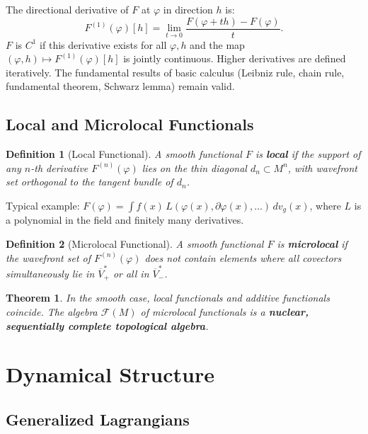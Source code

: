 \documentclass[11pt,a4paper]{article}
\newtheorem{definition}{Definition}[section]
\newtheorem{theorem}{Theorem}[section]
\begin{document}
The directional derivative of $F$ at $\varphi$ in direction $h$ is:
\begin{equation}
  F^{(1)}(\varphi)[h] = \lim_{t \to 0} \frac{F(\varphi + th) - F(\varphi)}{t}.
\end{equation}
$F$ is $C^1$ if this derivative exists for all $\varphi, h$ and the map
$(\varphi, h) \mapsto F^{(1)}(\varphi)[h]$ is jointly continuous. Higher
derivatives are defined iteratively. The fundamental results of basic
calculus (Leibniz rule, chain rule, fundamental theorem, Schwarz lemma)
remain valid.

\subsection{Local and Microlocal Functionals}

\begin{definition}[Local Functional]
A smooth functional $F$ is \textbf{local} if the support of any
$n$-th derivative $F^{(n)}(\varphi)$ lies on the thin diagonal
$d_n \subset M^n$, with wavefront set orthogonal to the tangent
bundle of $d_n$.
\end{definition}

Typical example: $F(\varphi) = \int f(x)\, L(\varphi(x), \partial\varphi(x),\ldots)\, dv_g(x)$,
where $L$ is a polynomial in the field and finitely many derivatives.

\begin{definition}[Microlocal Functional]
A smooth functional $F$ is \textbf{microlocal} if the wavefront set
of $F^{(n)}(\varphi)$ does not contain elements where all covectors
simultaneously lie in $\overline{V}_+^*$ or all in $\overline{V}_-^*$.
\end{definition}

\begin{theorem}
In the smooth case, local functionals and additive functionals coincide.
The algebra $\mathscr{F}(M)$ of microlocal functionals is a
\textbf{nuclear, sequentially complete topological algebra}.
\end{theorem}

\section{Dynamical Structure}

\subsection{Generalized Lagrangians}
\end{document}
